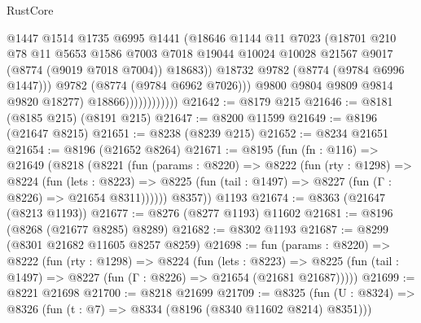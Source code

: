 \begin{lexlean}{RustCore}
\begin{coremodule}
                                  @1447
                                  @1514
                                  @1735
                                  @6995
                                  @1441
                                  (@18646
                                    @1144
                                    @11
                                    @7023
                                    (@18701
                                      @210
                                      @78
                                      @11
                                      @5653
                                      @1586
                                      @7003
                                      @7018
                                      @19044
                                      @10024
                                      @10028
                                      @21567
                                      @9017
                                      (@8774 (@9019 @7018 @7004))
                                      @18683))
                                  @18732
                                  @9782
                                  (@8774 (@9784 @6996 @1447)))
                                @9782
                                (@8774 (@9784 @6962 @7026)))
                              @9800
                              @9804
                              @9809
                              @9814
                              @9820
                              @18277)
                            @18866))))))))))))
@21642 := @8179 @215
@21646 := @8181 (@8185 @215) (@8191 @215)
@21647 := @8200 @11599
@21649 := @8196 (@21647 @8215)
@21651 := @8238 (@8239 @215)
@21652 := @8234 @21651
@21654 := @8196 (@21652 @8264)
@21671 := @8195
    (fun (fn : @116) =>
    @21649
      (@8218
        (@8221
          (fun (params : @8220) =>
          @8222
            (fun (rty : @1298) =>
            @8224
              (fun (lets : @8223) =>
              @8225 (fun (tail : @1497) => @8227 (fun (Γ : @8226) => @21654 @8311))))))
        @8357))
    @1193
@21674 := @8363 (@21647 (@8213 @1193))
@21677 := @8276 (@8277 @1193) @11602
@21681 := @8196 (@8268 (@21677 @8285) @8289)
@21682 := @8302 @1193
@21687 := @8299 (@8301 @21682 @11605 @8257 @8259)
@21698 := fun (params : @8220) =>
  @8222
    (fun (rty : @1298) =>
    @8224
      (fun (lets : @8223) =>
      @8225 (fun (tail : @1497) => @8227 (fun (Γ : @8226) => @21654 (@21681 @21687)))))
@21699 := @8221 @21698
@21700 := @8218 @21699
@21709 := @8325
    (fun (U : @8324) => @8326 (fun (t : @7) => @8334 (@8196 (@8340 @11602 @8214) @8351)))

\end{coremodule}
\end{lexlean}
